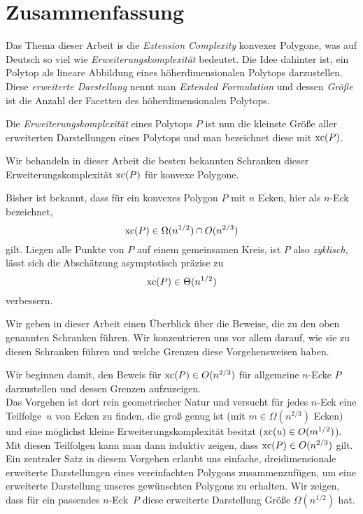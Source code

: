 \section*{Zusammenfassung}

Das Thema dieser Arbeit is die \emph{Extension Complexity} konvexer Polygone, was auf Deutsch so viel wie \emph{Erweiterungskomplexität} bedeutet. Die Idee dahinter ist, ein Polytop als lineare Abbildung eines höherdimensionalen Polytops darzustellen. Diese \emph{erweiterte Darstellung} nennt man \emph{Extended Formulation} und dessen \emph{Größe} ist die Anzahl der Facetten des höherdimensionalen Polytops.

Die \emph{Erweiterungskomplexität} eines Polytops $P$ ist nun die kleinste Größe aller erweiterten Darstellungen eines Polytops und man bezeichnet diese mit $\operatorname{xc}(P)$.

Wir behandeln in dieser Arbeit die besten bekannten Schranken dieser Erweiterungskomplexität $\operatorname{xc}(P)$ für konvexe Polygone. 

Bisher ist bekannt, dass für ein konvexes Polygon $P$ mit $n$ Ecken, hier als $n$-Eck bezeichnet, $$\operatorname{xc}(P) \in \Omega(n^{1/2}) \cap O(n^{2/3})$$ gilt. Liegen alle Punkte von $P$ auf einem gemeinsamen Kreis, ist $P$ also \emph{zyklisch}, lässt sich die Abschätzung asymptotisch präzise zu $$\operatorname{xc}(P) \in \Theta(n^{1/2})$$ verbessern.

Wir geben in dieser Arbeit einen Überblick über die Beweise, die zu den oben genannten Schranken führen. Wir konzentrieren uns vor allem darauf, wie sie zu diesen Schranken führen und welche Grenzen diese Vorgehensweisen haben.

Wir beginnen damit, den Beweis für $\operatorname{xc}(P) \in O(n^{2/3})$ für allgemeine $n$-Ecke $P$ darzustellen und dessen Grenzen aufzuzeigen.\\
Das Vorgehen ist dort rein geometrischer Natur und versucht für jedes $n$-Eck eine Teilfolge~$u$ von Ecken zu finden, die groß genug ist (mit $m \in \Omega(n^{2/3})$ Ecken) und eine möglichst kleine Erweiterungskomplexität besitzt ($\operatorname{xc}(u) \in O(m^{1/2})$). Mit diesen Teilfolgen kann man dann induktiv zeigen, dass $\operatorname{xc}(P) \in O(n^{2/3})$ gilt.\\
Ein zentraler Satz in diesem Vorgehen erlaubt uns einfache, dreidimensionale erweiterte Darstellungen eines vereinfachten Polygons zusammenzufügen, um eine erweiterte Darstellung unseres gewünschten Polygons zu erhalten. Wir zeigen, dass für ein passendes \mbox{$n$-Eck $P$} diese erweiterte Darstellung Größe $\Omega(n^{1/2})$ hat.

